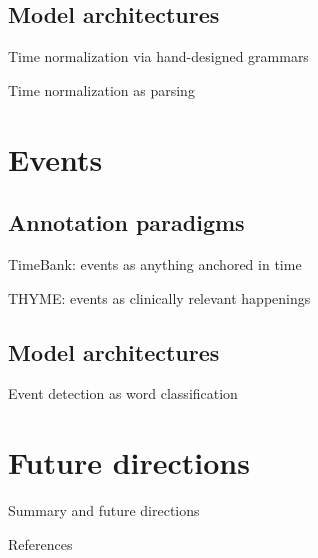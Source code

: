 \documentclass[12pt,compress]{beamer}
\begin{document}
\subsection{Model architectures}


\begin{frame}{Time normalization via hand-designed grammars}
\end{frame}


\begin{frame}{Time normalization as parsing}
\end{frame}


\section{Events}


\subsection{Annotation paradigms}


\begin{frame}{TimeBank: events as anything anchored in time}
\end{frame}


\begin{frame}{THYME: events as clinically relevant happenings}
\end{frame}




\subsection{Model architectures}

\begin{frame}{Event detection as word classification}
\end{frame}


\section{Future directions}


\begin{frame}{Summary and future directions}
\end{frame}


\begin{frame}[allowframebreaks]{References}
\printbibliography
\end{frame}
\end{document}
